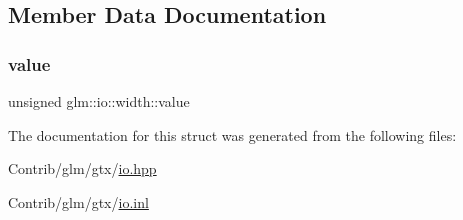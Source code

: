 \subsection{Member Data Documentation}
\mbox{\label{structglm_1_1io_1_1width_a6bf1338eb947811d36ec93bd2e9b8425}} 
\subsubsection{\texorpdfstring{value}{value}}
{\footnotesize\ttfamily unsigned glm\+::io\+::width\+::value}



The documentation for this struct was generated from the following files\+:\begin{DoxyCompactItemize}
\item 
Contrib/glm/gtx/\mbox{\hyperlink{io_8hpp}{io.\+hpp}}\item 
Contrib/glm/gtx/\mbox{\hyperlink{io_8inl}{io.\+inl}}\end{DoxyCompactItemize}
